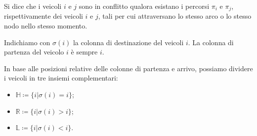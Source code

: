 \documentclass[../main.tex]{subfiles}
\begin{document}
Si dice che i veicoli $i$ e $j$ sono in conflitto qualora esistano i percorsi $\pi_i$ e $\pi_j$, rispettivamente dei veicoli $i$ e $j$, tali per cui attraversano lo stesso arco o lo stesso nodo nello stesso momento.

Indichiamo con $\sigma(i)$ la colonna di destinazione del veicoli $i$. La colonna di partenza del veicolo $i$ è sempre $i$.

In base alle posizioni relative delle colonne di partenza e arrivo, possiamo dividere i veicoli in tre insiemi complementari:
\begin{itemize}
  \item $\mathbb{H} \coloneqq \{i | \sigma(i) = i\}$;
  \item $\mathbb{R} \coloneqq \{i | \sigma(i) > i\}$;
  \item $\mathbb{L} \coloneqq \{i | \sigma(i) < i\}$.
\end{itemize}
\end{document}
